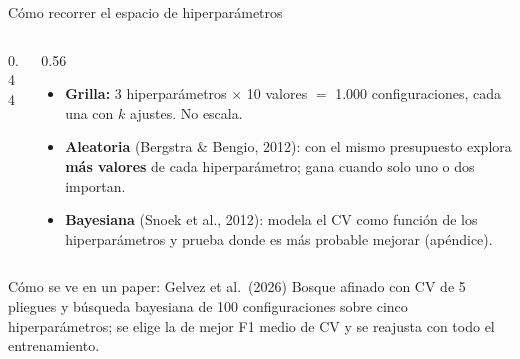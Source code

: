 \documentclass{beamer}
\newcommand{\1}{\mathbb{I}}
\begin{document}
\begin{frame}{Cómo recorrer el espacio de hiperparámetros}
\small
\begin{columns}[T]
\begin{column}{0.44\textwidth}
\begin{center}
\end{center}
\end{column}
\begin{column}{0.56\textwidth}
\vspace{0.05cm}
\begin{itemize}\itemsep3pt
  \item \textbf{Grilla:} 3 hiperparámetros $\times$ 10 valores $=$ 1.000 configuraciones, cada una con $k$ ajustes. No escala.
  \item \textbf{Aleatoria} (Bergstra \& Bengio, 2012): con el mismo presupuesto explora \textbf{más valores} de cada hiperparámetro; gana cuando solo uno o dos importan.
  \item \textbf{Bayesiana} (Snoek et al., 2012): modela el CV como función de los hiperparámetros y prueba donde es más probable mejorar (apéndice).
\end{itemize}
\end{column}
\end{columns}
\pause
\vspace{0.1cm}
\begin{block}{Cómo se ve en un paper: Gelvez et al.\ (2026)}
Bosque afinado con CV de 5 pliegues y búsqueda bayesiana de 100 configuraciones sobre cinco hiperparámetros; se elige la de mejor F1 medio de CV y se reajusta con todo el entrenamiento.
\end{block}
\end{frame}
\end{document}
